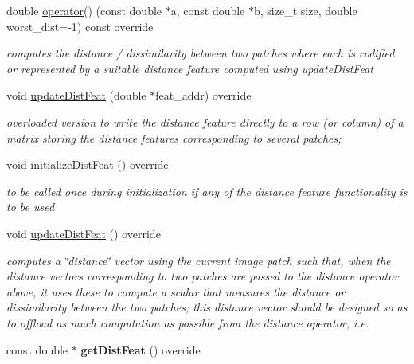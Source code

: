 \begin{DoxyCompactItemize}
\item 
\hypertarget{classSSIM_a28f65c16218bc5cbec37927f327ab786}{double \hyperlink{classSSIM_a28f65c16218bc5cbec37927f327ab786}{operator()} (const double $\ast$a, const double $\ast$b, size\-\_\-t size, double worst\-\_\-dist=-\/1) const override}\label{classSSIM_a28f65c16218bc5cbec37927f327ab786}

\begin{DoxyCompactList}\small\item\em computes the distance / dissimilarity between two patches where each is codified or represented by a suitable distance feature computed using update\-Dist\-Feat \end{DoxyCompactList}\item 
\hypertarget{classSSIM_a573541eca37f7d77bd5c9f82e24e535b}{void \hyperlink{classSSIM_a573541eca37f7d77bd5c9f82e24e535b}{update\-Dist\-Feat} (double $\ast$feat\-\_\-addr) override}\label{classSSIM_a573541eca37f7d77bd5c9f82e24e535b}

\begin{DoxyCompactList}\small\item\em overloaded version to write the distance feature directly to a row (or column) of a matrix storing the distance features corresponding to several patches; \end{DoxyCompactList}\item 
\hypertarget{classSSIM_a912c75fe6220b8e500909b06767d3ace}{void \hyperlink{classSSIM_a912c75fe6220b8e500909b06767d3ace}{initialize\-Dist\-Feat} () override}\label{classSSIM_a912c75fe6220b8e500909b06767d3ace}

\begin{DoxyCompactList}\small\item\em to be called once during initialization if any of the distance feature functionality is to be used \end{DoxyCompactList}\item 
void \hyperlink{classSSIM_ae9662a4e19d8858c9b17983790a78366}{update\-Dist\-Feat} () override
\begin{DoxyCompactList}\small\item\em computes a \char`\"{}distance\char`\"{} vector using the current image patch such that, when the distance vectors corresponding to two patches are passed to the distance operator above, it uses these to compute a scalar that measures the distance or dissimilarity between the two patches; this distance vector should be designed so as to offload as much computation as possible from the distance operator, i.\-e. \end{DoxyCompactList}\item 
\hypertarget{classSSIM_abc6454a7c2cd6d1c5a5a73afee5d410f}{const double $\ast$ {\bfseries get\-Dist\-Feat} () override}\label{classSSIM_abc6454a7c2cd6d1c5a5a73afee5d410f}


\end{DoxyCompactItemize}
